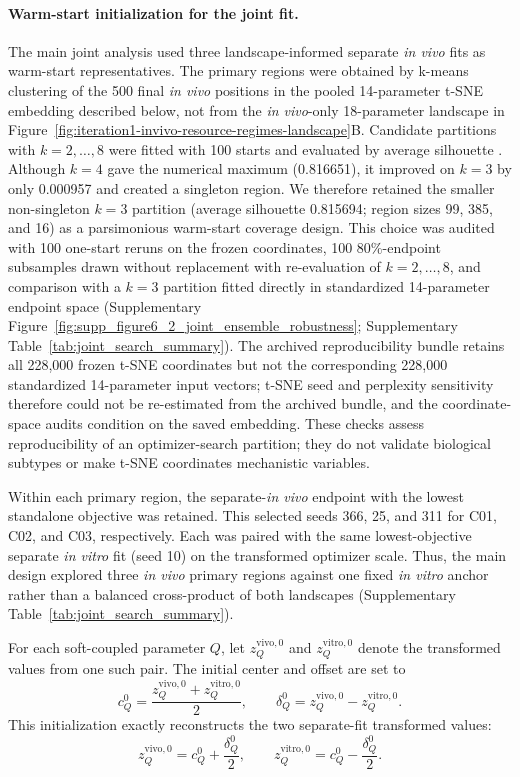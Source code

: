 \documentclass[11pt]{article}
\begin{document}
\paragraph{Warm-start initialization for the joint fit.}

The main joint analysis used three landscape-informed separate \textit{in vivo} fits as warm-start representatives. The primary regions were obtained by k-means clustering of the 500 final \textit{in vivo} positions in the pooled 14-parameter t-SNE embedding described below, not from the \textit{in vivo}-only 18-parameter landscape in Figure~\ref{fig:iteration1-invivo-resource-regimes-landscape}B. Candidate partitions with $k=2,\ldots,8$ were fitted with 100 starts and evaluated by average silhouette \cite{rousseeuw_silhouettes_1987}. Although $k=4$ gave the numerical maximum (0.816651), it improved on $k=3$ by only 0.000957 and created a singleton region. We therefore retained the smaller non-singleton $k=3$ partition (average silhouette 0.815694; region sizes 99, 385, and 16) as a parsimonious warm-start coverage design. This choice was audited with 100 one-start reruns on the frozen coordinates, 100 80\%-endpoint subsamples drawn without replacement with re-evaluation of $k=2,\ldots,8$, and comparison with a $k=3$ partition fitted directly in standardized 14-parameter endpoint space (Supplementary Figure~\ref{fig:supp_figure6_2_joint_ensemble_robustness}; Supplementary Table~\ref{tab:joint_search_summary}). The archived reproducibility bundle retains all 228,000 frozen t-SNE coordinates but not the corresponding 228,000 standardized 14-parameter input vectors; t-SNE seed and perplexity sensitivity therefore could not be re-estimated from the archived bundle, and the coordinate-space audits condition on the saved embedding. These checks assess reproducibility of an optimizer-search partition; they do not validate biological subtypes or make t-SNE coordinates mechanistic variables.

Within each primary region, the separate-\textit{in vivo} endpoint with the lowest standalone objective was retained. This selected seeds 366, 25, and 311 for C01, C02, and C03, respectively. Each was paired with the same lowest-objective separate \textit{in vitro} fit (seed 10) on the transformed optimizer scale. Thus, the main design explored three \textit{in vivo} primary regions against one fixed \textit{in vitro} anchor rather than a balanced cross-product of both landscapes (Supplementary Table~\ref{tab:joint_search_summary}).

For each soft-coupled parameter $Q$, let $z_Q^{\mathrm{vivo},0}$ and $z_Q^{\mathrm{vitro},0}$ denote the transformed values from one such pair. The initial center and offset are set to
\begin{equation}
c_Q^{0} = \frac{z_Q^{\mathrm{vivo},0} + z_Q^{\mathrm{vitro},0}}{2}, \qquad \delta_Q^{0} = z_Q^{\mathrm{vivo},0} - z_Q^{\mathrm{vitro},0}.
\label{eq:appendix_joint_warm_start_soft}
\end{equation}
This initialization exactly reconstructs the two separate-fit transformed values:
\[
z_Q^{\mathrm{vivo},0} = c_Q^0+\frac{\delta_Q^0}{2}, \qquad z_Q^{\mathrm{vitro},0} = c_Q^0-\frac{\delta_Q^0}{2}.
\]
\end{document}
